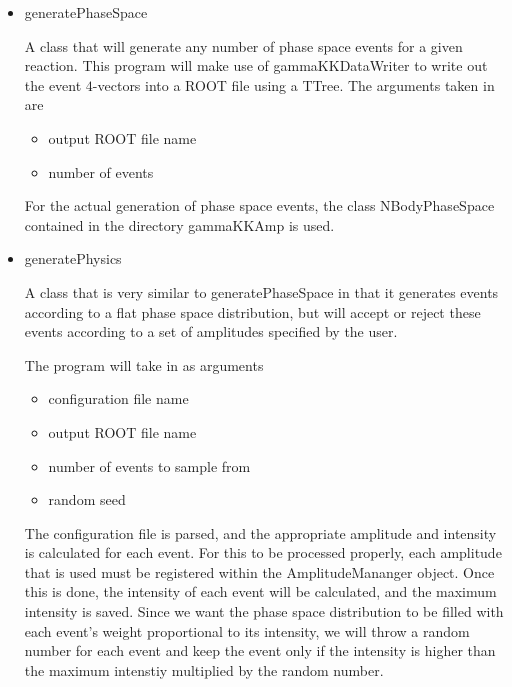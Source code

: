 \documentclass[11pt]{article}
\begin{document}
\begin{itemize}

  \item generatePhaseSpace

    A class that will generate any number of phase space
    events for a given reaction. This program will make use of
    gammaKKDataWriter to write out the event $4$-vectors into a ROOT
    file using a TTree. The arguments taken in are
    \begin{itemize}
      \item output ROOT file name
      \item number of events
    \end{itemize}

    For the actual generation of phase space events, the class
    NBodyPhaseSpace contained in the directory gammaKKAmp is
    used.

  \item generatePhysics

    A class that is very similar to generatePhaseSpace in that it
    generates events according to a flat phase space distribution, but
    will accept or reject these events according to a set of
    amplitudes specified by the user.

    The program will take in as arguments
    \begin{itemize}
      \item configuration file name
      \item output ROOT file name
      \item number of events to sample from
      \item random seed
    \end{itemize}
    The configuration file is parsed, and the appropriate amplitude
    and intensity is calculated for each event. For this to be
    processed properly, each amplitude that is used must be registered
    within the AmplitudeMananger object. Once this is done, the
    intensity of each event will be calculated, and the maximum
    intensity is saved. Since we want the phase space distribution to
    be filled with each event's weight proportional to its intensity,
    we will throw a random number for each event and keep the event
    only if the intensity is higher than the maximum intenstiy
    multiplied by the random number.


\end{itemize}
\end{document}
